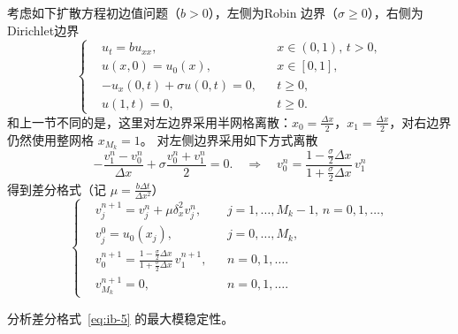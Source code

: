考虑如下扩散方程初边值问题（$b > 0$），左侧为Robin 边界（$\sigma \ge 0$），右侧为Dirichlet边界
\[
    \left\{
    \begin{aligned}
         & u_t = b u_{xx},                 &  & x \in (0,1),\, t > 0, \\
         & u(x,0) = u_0(x),                &  & x \in [0,1],          \\
         & - u_x(0,t) + \sigma u(0,t) = 0, &  & t \ge 0,              \\
         & u(1,t) = 0,                     &  & t \ge 0.
    \end{aligned}
    \right.
\]
和上一节不同的是，这里对左边界采用半网格离散：$x_{0} = \frac{\Delta x}2$，$x_1 = \frac{\Delta x}2$，对右边界仍然使用整网格 $x_{M_k} = 1$。
对左侧边界采用如下方式离散
\[
    - \frac{v_1^n - v_{0}^n}{\Delta x} + \sigma \frac{v_0^n + v_1^n}2 = 0.\quad\Rightarrow\quad v_0^{n} = \frac{1-\frac{\sigma}2 \Delta x}{1 +\frac{\sigma}2 \Delta x}\, v_1^{n}
\]
得到差分格式（记 $\mu = \frac{b \Delta t}{\Delta x^2}$）
\begin{equation}
    \left\{
    \begin{aligned}
         & v_j^{n+1} = v_j^n + \mu \delta_x^2 v_j^n,                                             &  & j=1,\dots,M_k-1,\, n=0,1,\dots, \\
         & v_j^0 = u_0(x_j),                                                                     &  & j=0,\dots,M_k,                  \\
         & v_0^{n+1} = \frac{1-\frac{\sigma}2 \Delta x}{1 +\frac{\sigma}2 \Delta x}\, v_1^{n+1}, &  & n=0,1,\dots.                    \\
         & v_{M_k}^{n+1} = 0,                                                                    &  & n=0,1,\dots.
    \end{aligned}
    \right.    \label{eq:ib-5}
\end{equation}

\begin{example}
    分析差分格式~\eqref{eq:ib-5} 的最大模稳定性。
\end{example}

